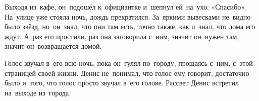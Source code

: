 Выходя из~кафе, он~подошёл к~официантке и~шепнул ей~на~ухо: «Спасибо».
На~улице уже стояла ночь, дождь прекратился.
За~яркими вывесками не~видно было звёзд, но~он~знал, что они там есть, точно также, как и~знал, что дома его ждут.
А~раз его простили, раз она заговорила с~ним, значит он~нужен там, значит он~возвращается домой.

Голос звучал в~его всю ночь, пока он~гулял по~городу, прощаясь с~ним, с~этой страницей своей жизни.
Денис не~понимал, что голос ему говорит, достаточно было и~того, что голос просто звучал в~его голове.
Рассвет Денис встретил на~выходе из~города.